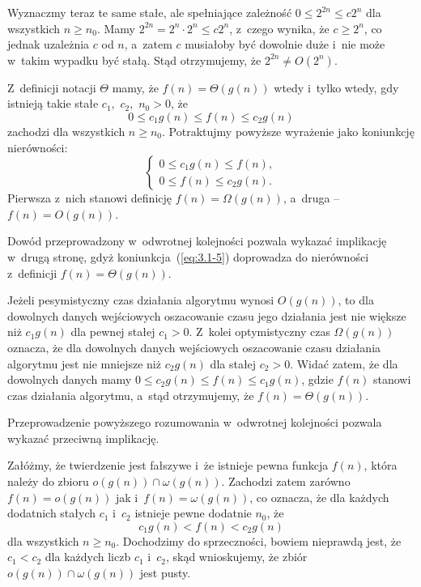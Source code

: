 Wyznaczmy teraz te same stałe, ale spełniające zależność $0\le2^{2n}\le c2^n$ dla wszystkich $n\ge n_0$. Mamy $2^{2n}=2^n\cdot2^n\le c2^n$, z~czego wynika, że $c\ge2^n$, co jednak uzależnia $c$ od $n$, a~zatem $c$ musiałoby być dowolnie duże i~nie może w~takim wypadku być stałą. Stąd otrzymujemy, że $2^{2n}\ne O(2^n)$.

\exercise{} %
Z~definicji notacji $\Theta$ mamy, że $f(n)=\Theta(g(n))$ wtedy i~tylko wtedy, gdy istnieją takie stałe $c_1$,~$c_2$,~$n_0>0$, że
\[
	0 \le c_1g(n) \le f(n) \le c_2g(n)
\]
zachodzi dla wszystkich $n\ge n_0$. Potraktujmy powyższe wyrażenie jako koniunkcję nierówności:
\begin{equation}
	\begin{cases}
		0 \le c_1g(n) \le f(n), \\
		0 \le f(n) \le c_2g(n).
	\end{cases} \label{eq:3.1-5}
\end{equation}
Pierwsza z~nich stanowi definicję $f(n)=\Omega(g(n))$, a~druga -- $f(n)=O(g(n))$.

Dowód przeprowadzony w~odwrotnej kolejności pozwala wykazać implikację w~drugą stronę, gdyż koniunkcja~(\ref{eq:3.1-5}) doprowadza do nierówności z~definicji $f(n)=\Theta(g(n))$.

\exercise{} %
Jeżeli pesymistyczny czas działania algorytmu wynosi $O(g(n))$, to dla dowolnych danych wejściowych oszacowanie czasu jego działania jest nie większe niż $c_1g(n)$ dla pewnej stałej $c_1>0$. Z~kolei optymistyczny czas $\Omega(g(n))$ oznacza, że dla dowolnych danych wejściowych oszacowanie czasu działania algorytmu jest nie mniejsze niż $c_2g(n)$ dla stałej $c_2>0$. Widać zatem, że dla dowolnych danych mamy $0\le c_2g(n)\le f(n)\le c_1g(n)$, gdzie $f(n)$ stanowi czas działania algorytmu, a~stąd otrzymujemy, że $f(n)=\Theta(g(n))$.

Przeprowadzenie powyższego rozumowania w~odwrotnej kolejności pozwala wykazać przeciwną implikację.

\exercise{} %
Załóżmy, że twierdzenie jest fałszywe i~że istnieje pewna funkcja $f(n)$, która należy do zbioru $o(g(n))\cap\omega(g(n))$. Zachodzi zatem zarówno $f(n)=o(g(n))$ jak i~$f(n)=\omega(g(n))$, co oznacza, że dla każdych dodatnich stałych $c_1$ i~$c_2$ istnieje pewne dodatnie $n_0$, że
\[
	c_1g(n) < f(n) < c_2g(n)
\]
dla wszystkich $n\ge n_0$. Dochodzimy do sprzeczności, bowiem nieprawdą jest, że $c_1<c_2$ dla każdych liczb $c_1$ i~$c_2$, skąd wnioskujemy, że zbiór $o(g(n))\cap\omega(g(n))$ jest pusty.

